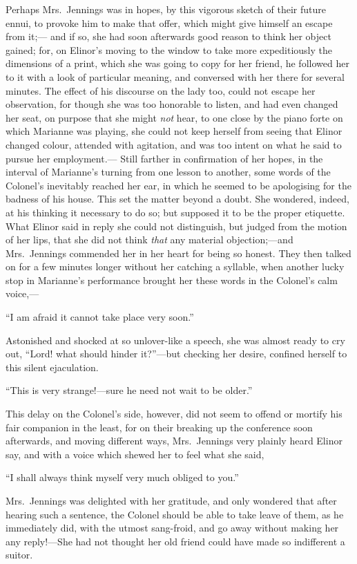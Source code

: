 \documentclass{article}
\begin{document}
Perhaps Mrs.\ Jennings was in hopes, by this vigorous
sketch of their future ennui, to provoke him to make
that offer, which might give himself an escape from it;---%
and if so, she had soon afterwards good reason to think
her object gained; for, on Elinor's moving to the window
to take more expeditiously the dimensions of a print,
which she was going to copy for her friend, he followed
her to it with a look of particular meaning, and conversed
with her there for several minutes.  The effect of his
discourse on the lady too, could not escape her observation,
for though she was too honorable to listen, and had even
changed her seat, on purpose that she might \emph{not} hear,
to one close by the piano forte on which Marianne
was playing, she could not keep herself from seeing
that Elinor changed colour, attended with agitation,
and was too intent on what he said to pursue her employment.---%
Still farther in confirmation of her hopes, in the interval
of Marianne's turning from one lesson to another,
some words of the Colonel's inevitably reached her ear,
in which he seemed to be apologising for the badness
of his house.  This set the matter beyond a doubt.
She wondered, indeed, at his thinking it necessary
to do so; but supposed it to be the proper etiquette.
What Elinor said in reply she could not distinguish,
but judged from the motion of her lips, that she did
not think \emph{that} any material objection;---and Mrs.\ Jennings
commended her in her heart for being so honest.
They then talked on for a few minutes longer without her
catching a syllable, when another lucky stop in Marianne's
performance brought her these words in the Colonel's calm voice,---%

``I am afraid it cannot take place very soon.''

Astonished and shocked at so unlover-like a speech,
she was almost ready to cry out, ``Lord! what should
hinder it?''---but checking her desire, confined herself
to this silent ejaculation.

``This is very strange!---sure he need not wait to be older.''

This delay on the Colonel's side, however, did not
seem to offend or mortify his fair companion in the least,
for on their breaking up the conference soon afterwards,
and moving different ways, Mrs.\ Jennings very plainly heard
Elinor say, and with a voice which shewed her to feel what she said,

``I shall always think myself very much obliged to you.''

Mrs.\ Jennings was delighted with her gratitude,
and only wondered that after hearing such a sentence,
the Colonel should be able to take leave of them, as he
immediately did, with the utmost sang-froid, and go away
without making her any reply!---She had not thought her old
friend could have made so indifferent a suitor.
\end{document}
